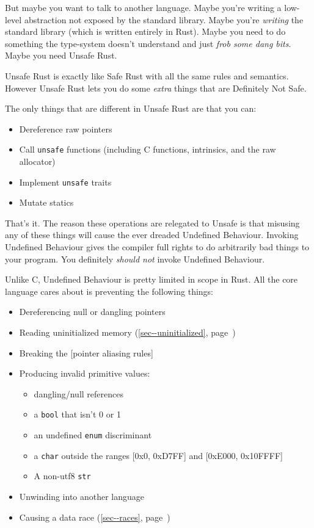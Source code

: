 \documentclass[a4paper,]{book}
\renewcommand*{\hyperref}[2][\ar]{%
  \def\ar{#2}%
  #2 (\autoref{#1}, page~\pageref{#1})}
\providecommand{\tightlist}{%
  \setlength{\itemsep}{0pt}\setlength{\parskip}{0pt}}
\begin{document}
But maybe you want to talk to another language. Maybe you're writing a
low-level abstraction not exposed by the standard library. Maybe you're
\emph{writing} the standard library (which is written entirely in Rust).
Maybe you need to do something the type-system doesn't understand and
just \emph{frob some dang bits}. Maybe you need Unsafe Rust.

Unsafe Rust is exactly like Safe Rust with all the same rules and
semantics. However Unsafe Rust lets you do some \emph{extra} things that
are Definitely Not Safe.

The only things that are different in Unsafe Rust are that you can:

\begin{itemize}
\tightlist
\item
  Dereference raw pointers
\item
  Call \texttt{unsafe} functions (including C functions, intrinsics, and
  the raw allocator)
\item
  Implement \texttt{unsafe} traits
\item
  Mutate statics
\end{itemize}

That's it. The reason these operations are relegated to Unsafe is that
misusing any of these things will cause the ever dreaded Undefined
Behaviour. Invoking Undefined Behaviour gives the compiler full rights
to do arbitrarily bad things to your program. You definitely
\emph{should not} invoke Undefined Behaviour.

Unlike C, Undefined Behaviour is pretty limited in scope in Rust. All
the core language cares about is preventing the following things:

\begin{itemize}
\tightlist
\item
  Dereferencing null or dangling pointers
\item
  Reading \hyperref[sec--uninitialized]{uninitialized memory}
\item
  Breaking the {[}pointer aliasing rules{]}
\item
  Producing invalid primitive values:

  \begin{itemize}
  \tightlist
  \item
    dangling/null references
  \item
    a \texttt{bool} that isn't 0 or 1
  \item
    an undefined \texttt{enum} discriminant
  \item
    a \texttt{char} outside the ranges {[}0x0, 0xD7FF{]} and {[}0xE000,
    0x10FFFF{]}
  \item
    A non-utf8 \texttt{str}
  \end{itemize}
\item
  Unwinding into another language
\item
  Causing a \hyperref[sec--races]{data race}
\end{itemize}
\end{document}
